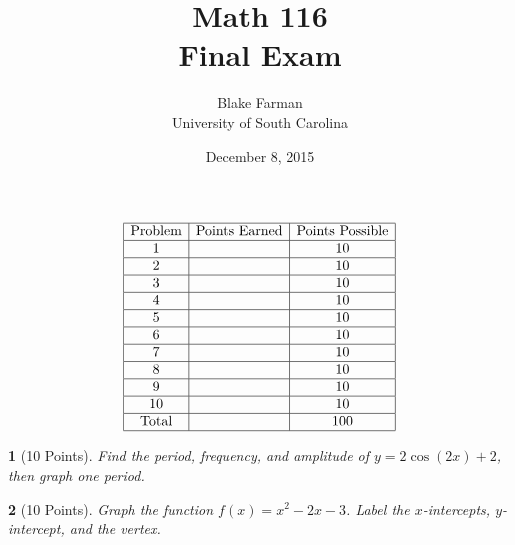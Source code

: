 \documentclass[12pt]{amsart}
\author{Blake Farman\\University of South Carolina}
\title{Math 116\\Final Exam}
\date{December 8, 2015}
\begin{document}
\maketitle

\begin{center}
\end{center}

\vspace{0.2in}
\vspace{0.2in}

$$
\begin{array}{|c|c|c|}
  \hline
  \text{Problem} & \text{Points Earned} & \text{Points Possible}\\
  \hline
  1 & & 10\\
  \hline
  2 & & 10\\
  \hline
  3 & & 10\\
  \hline
  4 & & 10\\
  \hline
  5 & & 10 \\
  \hline
  6 & & 10 \\
  \hline
  7 & & 10 \\
  \hline
  8 & & 10 \\
  \hline
  9 & & 10 \\
  \hline
  10 & & 10 \\
  \hline
  \text{Total} & & 100\\
  \hline
\end{array}
$$

\newpage


\theoremstyle{plain}
\newtheorem{thm}{}
\newtheorem{lem}{Lemma}
\theoremstyle{definition}
\newtheorem{defn}{Definition}

\begin{thm}[10 Points]\label{ex1}
  Find the period, frequency, and amplitude of $y = 2\cos(2x) + 2$, then graph one period.
\end{thm}

\newpage

\begin{thm}[10 Points]
	Graph the function $f(x) = x^2 - 2x - 3$.
	Label the $x$-intercepts, $y$-intercept, and the vertex.
	\vspace{3.5in}
\end{thm}
\end{document}
